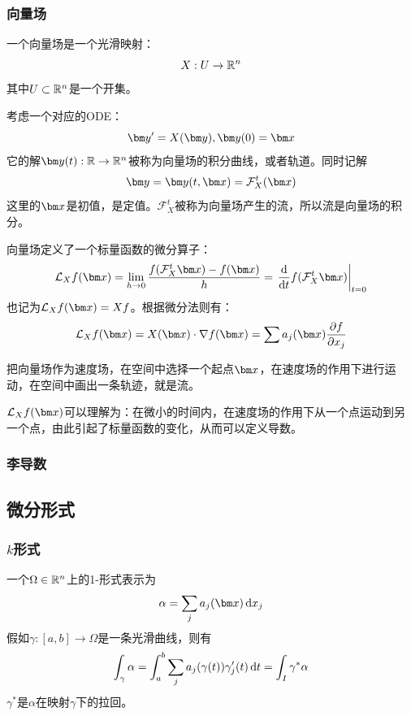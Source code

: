 \subsubsection{向量场}\label{vector-field}
\begin{definition}[向量场]
一个向量场是一个光滑映射：
$$X:U\rightarrow \mathbb{R}^n$$
其中$U\subset \mathbb{R}^n$是一个开集。

考虑一个对应的ODE：
$$\by'=X(\by),\by(0)=\bx$$
它的解$\by(t):\mathbb{R}\rightarrow\Rns$被称为向量场的积分曲线，或者轨道。同时记解
$$\by=\by(t,\bx)=\mathcal{F}_X^t(\bx)$$
这里的$\bx$是初值，是定值。$\mathcal{F}_X^t$被称为向量场产生的流，所以流是向量场的积分。

向量场定义了一个标量函数的微分算子：
$$\mathcal{L}_Xf(\bx)=\lim_{h\rightarrow 0}\frac{f(\mathcal{F}_X^t\bx)-f(\bx)}{h}=\left.\odv{}{t}f(\mathcal{F}_X^t\bx)\right|_{t=0}$$
也记为$\mathcal{L}_X f(\bx)=Xf$。根据微分法则有：
$$\mathcal{L}_X f(\bx)=X(\bx)\cdot \nabla f(\bx)=\sum a_j(\bx)\pdv{f}{x_j}$$
\end{definition}
把向量场作为速度场，在空间中选择一个起点$\bx$，在速度场的作用下进行运动，在空间中画出一条轨迹，就是流。

$\mathcal{L}_X f(\bx)$可以理解为：在微小的时间内，在速度场的作用下从一个点运动到另一个点，由此引起了标量函数的变化，从而可以定义导数。

\subsubsection{李导数}
\begin{definition}[李导数]

\end{definition}
\subsection{微分形式}
\subsubsection{$k$形式}
\begin{definition}[1-形式]
一个$\Omega\in\mathbb{R}^n$上的1-形式表示为
$$\alpha=\sum_j a_j(\bx)\dif x_j$$
假如$\gamma:[a,b]\rightarrow \Omega$是一条光滑曲线，则有
$$\int_{\gamma} \alpha=\int_a^b \sum_j a_j(\gamma(t))\gamma_j'(t)\mathop{}\!\mathrm{d} t=\int_I \gamma^{\ast}\alpha$$
$\gamma^{\ast}$是$\alpha$在映射$\gamma$下的拉回。
\end{definition}

